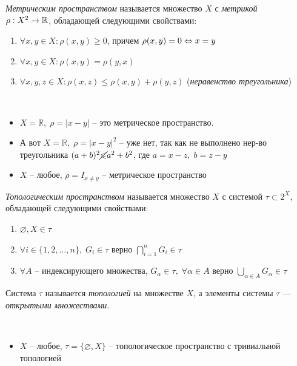 \begin{definition}
	\textit{Метрическим пространством} называется множество $X$ с \textit{метрикой} \\
    $\rho : X^2 \to \mathbb{R}$, обладающей следующими свойствами:
	\begin{enumerate}
		\item $\forall x, y \in X: \rho(x, y) \geqslant 0$, причем $\rho(x, y) = 0 \Leftrightarrow x = y$
		\item $\forall x, y \in X: \rho(x, y) = \rho(y, x)$
		\item $\forall x, y, z \in X: \rho(x, z) \leqslant \rho(x, y) + \rho(y, z)$ (\textit{неравенство треугольника})
	\end{enumerate}
\end{definition}

\begin{example}~
\begin{itemize}
    \item $X = \mathbb{R}, \; \rho = |x - y|$ -- это метрическое пространство. 
    \item А вот $X = \mathbb{R}, \; \rho = |x - y|^2$ -- уже нет, так как не выполнено нер-во треугольника $(a + b)^2  \cancel{\leqslant}a^2 + b^2 $, где $a=x-z, \; b=z-y$

    \item $X$ -- любое, $\rho = I_{x \neq y}$ -- метрическое пространство 
\end{itemize}
\end{example}

\begin{definition}
	\textit{Топологическим пространством} называется множество $X$ с системой $\tau \subset 2^X$, обладающей следующими свойствами:
	\begin{enumerate}
		\item $\varnothing, X \in \tau$
		\item $\forall i \in \{1, 2, \ldots, n\}, \;G_i \in \tau $ верно $\bigcap\limits_{i=1}^{n} G_i \in \tau$
		\item $\forall A $ -- индексирующего множества, $G_\alpha \in \tau, \; \forall \alpha \in A$  верно $ \bigcup\limits_{\alpha \in A}G_\alpha\in \tau$
	\end{enumerate}
	
	Система $\tau$ называется \textit{топологией} на множестве $X$, а элементы системы $\tau$ --- \textit{открытыми множествами}.
\end{definition}

\begin{example}~
\begin{itemize}
    \item $X$ -- любое, $\tau = \{\varnothing, X\}$ -- топологическое пространство с тривиальной топологией
\end{itemize}
\end{example}

